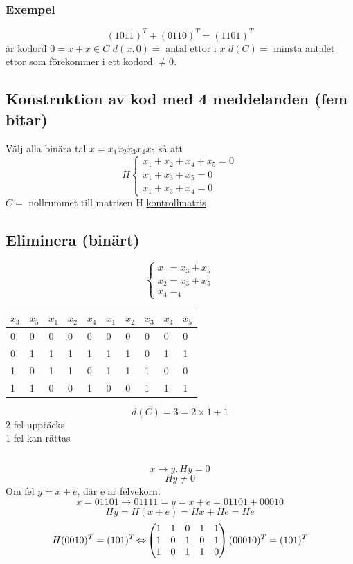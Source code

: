 \documentclass{article}
\begin{document}
\subsubsection{Exempel}
$$(1011)^T+(0110)^T=(1101)^T$$ är kodord
$ 0=x+x\in C$
$d(x,0) = $ antal ettor i $x$
$d(C) =$ minsta antalet ettor som förekommer i ett kodord $\neq 0$.

\subsection{Konstruktion av kod med 4 meddelanden (fem bitar)}
Välj alla binära tal $x=x_1 x_2 x_3 x_4 x_5$ så att
$$
H\begin{cases}
x_1+x_2+x_4+x_5=0\\
x_1+x_3+x_5=0\\
x_1+x_3+x_4=0
\end{cases}
$$
$C =$ nollrummet till matrisen H \uline{kontrollmatris}

\subsection{Eliminera (binärt)}
$$
\begin{cases}
x_1=x_3+x_5\\
x_2=x_3+x_5\\
x_4=_4
\end{cases}
$$

\begin{tabular}{ l l | l l l | l l l l l }
$x_3$ & $x_5$ & $x_1$ & $x_2$ & $x_4$ & $x_1$ & $x_2$ & $x_3$ & $x_4$ & $x_5$ \\\hline
0 & 0 & 0 & 0 & 0 & 0 & 0 & 0 & 0 & 0\\
0 & 1 & 1 & 1 & 1 & 1 & 1 & 0 & 1 & 1\\
1 & 0 & 1 & 1 & 0 & 1 & 1 & 1 & 0 & 0\\
1 & 1 & 0 & 0 & 1 & 0 & 0 & 1 & 1 & 1\\
\end{tabular}
$$d(C)=3=2\times 1+1$$
2 fel upptäcks\\
1 fel kan rättas

\subsection{}
$$ x\to y, Hy=0 $$
$$ Hy\neq 0 $$
Om fel $y=x+e$,
där e är felvekorn.
$$x=01101\to 01111=y=x+e=01101+00010$$
$$ Hy=H(x+e)=Hx+He=He $$
$$ H(0 0 1 0)^T=(1 0 1)^T\operatorname{\Leftrightarrow}
\left(\begin{matrix}1&1&0&1&1\\
1 &0&1&0&1\\
1&0&1&1&0\end{matrix}\right)
(0 0 0 1 0)^T =(1 0 1)^T
$$
\end{document}
